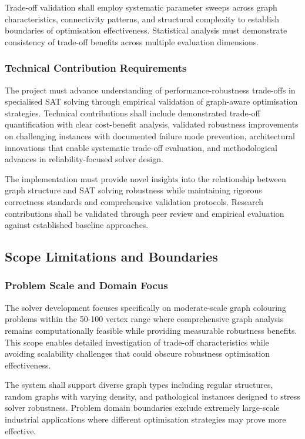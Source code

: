 Trade-off validation shall employ systematic parameter sweeps across graph characteristics, connectivity patterns, and structural complexity to establish boundaries of optimisation effectiveness. Statistical analysis must demonstrate consistency of trade-off benefits across multiple evaluation dimensions.

\subsubsection{Technical Contribution Requirements}
The project must advance understanding of performance-robustness trade-offs in specialised SAT solving through empirical validation of graph-aware optimisation strategies. Technical contributions shall include demonstrated trade-off quantification with clear cost-benefit analysis, validated robustness improvements on challenging instances with documented failure mode prevention, architectural innovations that enable systematic trade-off evaluation, and methodological advances in reliability-focused solver design.

The implementation must provide novel insights into the relationship between graph structure and SAT solving robustness while maintaining rigorous correctness standards and comprehensive validation protocols. Research contributions shall be validated through peer review and empirical evaluation against established baseline approaches.

\subsection{Scope Limitations and Boundaries}

\subsubsection{Problem Scale and Domain Focus}
The solver development focuses specifically on moderate-scale graph colouring problems within the 50-100 vertex range where comprehensive graph analysis remains computationally feasible while providing measurable robustness benefits. This scope enables detailed investigation of trade-off characteristics while avoiding scalability challenges that could obscure robustness optimisation effectiveness.

The system shall support diverse graph types including regular structures, random graphs with varying density, and pathological instances designed to stress solver robustness. Problem domain boundaries exclude extremely large-scale industrial applications where different optimisation strategies may prove more effective.

